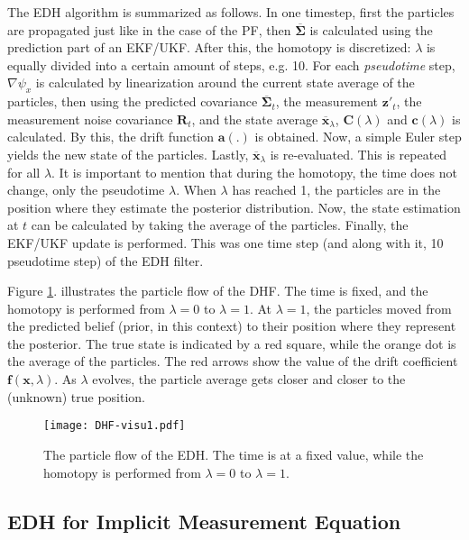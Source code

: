 The EDH algorithm is summarized as follows.
In one timestep, first the particles are propagated just like in the case of the PF, then $\overline{\mathbf{\Sigma}}$ is calculated using the prediction part of an EKF/UKF.  After this, the homotopy is discretized: $\lambda$ is equally divided into a certain amount of steps, e.g. 10. For each \emph{pseudotime} step, $\nabla \psi_x$ is calculated  by linearization around the current state average of the particles, then using the predicted covariance $\overline{\mathbf{\Sigma}}_t$, the measurement $\mathbf{z}'_t$, the measurement noise covariance $\mathbf{R}_t$, and the state average $\overline{\mathbf{x}}_\lambda$, $\mathbf{C}(\lambda)$ and $\mathbf{c}(\lambda)$ is calculated. By this, the drift function $\mathbf{a}(.)$ is obtained. Now, a simple Euler step yields the new state of the particles. Lastly, $\overline{\mathbf{x}}_\lambda$ is re-evaluated. This is repeated for all $\lambda$. It is important to mention that during the homotopy, the time does not change, only the pseudotime $\lambda$. When $\lambda$ has reached 1, the particles are in the position where they estimate the posterior distribution. Now, the state estimation at $t$ can be calculated by taking the average of the particles. Finally, the EKF/UKF update is performed. This was one time step (and along with it, 10 pseudotime step) of the EDH filter.

Figure \ref{fig:dhf-ill}. illustrates the particle flow of the DHF. The time is fixed, and the homotopy is performed from $\lambda = 0$ to $\lambda = 1$. At $\lambda = 1$, the particles moved from the predicted belief (prior, in this context) to their position where they represent the posterior. The true state is indicated by a red square, while the orange dot is the average of the particles. The red arrows show the value of the drift coefficient $\mathbf{f}(\mathbf{x},\lambda)$. As $\lambda$ evolves, the particle average gets closer and closer to the (unknown) true position.

\begin{figure}
    \centering
    \texttt{[image: DHF-visu1.pdf]}
    \caption{The particle flow of the EDH. The time is at a fixed value, while the homotopy is performed from $\lambda = 0$ to $\lambda = 1$.}
    \label{fig:dhf-ill}
\end{figure}

\subsection{EDH for Implicit Measurement Equation}

